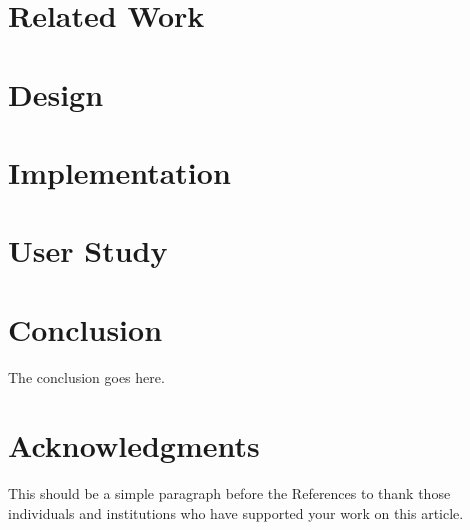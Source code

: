 \documentclass[lettersize,journal]{IEEEtran}
\begin{document}
 \section{Related Work}\label{sec:research}
 


 \section{Design}\label{sec:design}
 


 \section{Implementation}\label{sec:implementation}
 

 \section{User Study}\label{sec:user_study}
 


 \section{Conclusion}\label{sec:conclusion}
 The conclusion goes here.


 \section*{Acknowledgments}
 This should be a simple paragraph before the References to thank those individuals and institutions who have supported your work on this article.







\end{document}
